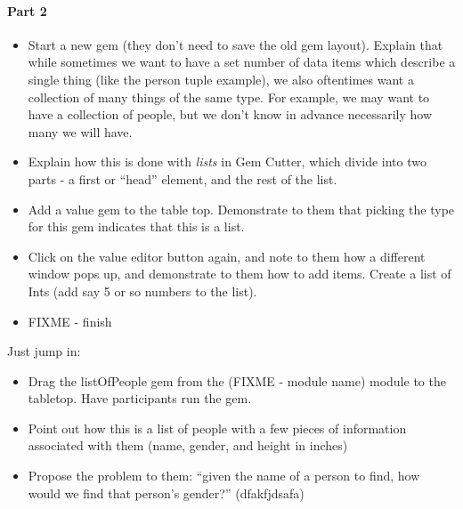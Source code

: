 {		\paragraph{Part 2}
		\begin{itemize}
			\item Start a new gem (they don't need to save the old gem layout).  Explain that while sometimes we want to have a set number of data items which describe a single thing (like the person tuple example), we also oftentimes want a collection of many things of the same type.  For example, we may want to have a collection of people, but we don't know in advance necessarily how many we will have.
			\item Explain how this is done with \emph{lists} in Gem Cutter, which divide into two parts - a first or ``head'' element, and the rest of the list.
			\item Add a value gem to the table top.  Demonstrate to them that picking the \code{[a]} type for this gem indicates that this is a list.
			\item Click on the value editor button again, and note to them how a different window pops up, and demonstrate to them how to add items.  Create a list of Ints (add say 5 or so numbers to the list).

			\item FIXME - finish		
		\end{itemize}
		
		Just jump in:
		\begin{itemize}
			\item Drag the listOfPeople gem from the (FIXME - module name) module to the tabletop.  Have participants run the gem.
			\item Point out how this is a list of people with a few pieces of information associated with them (name, gender, and height in inches)
			\item Propose the problem to them: ``given the name of a person to find, how would we find that person's gender?'' (\ie dfakfjdsafa)
		\end{itemize}
	}	